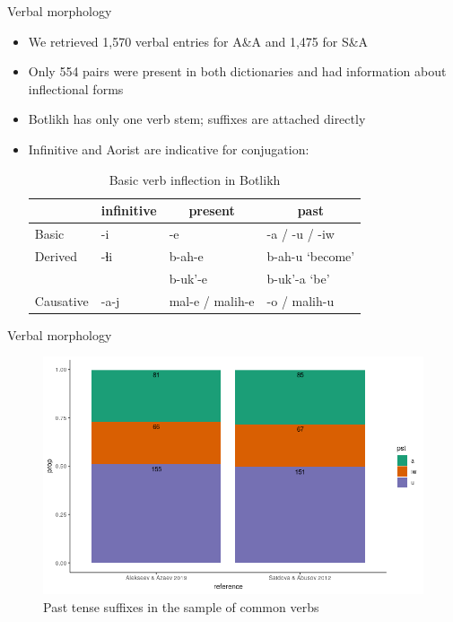 \begin{frame}{Verbal morphology}

\begin{itemize}
    \item We retrieved 1,570 verbal entries for A\&A and 1,475 for S\&A 
    \item Only 554 pairs were present in both dictionaries and had information about inflectional forms
    \pause
    \item Botlikh has only one verb stem; suffixes are attached directly
    \item Infinitive and Aorist are indicative for conjugation:
    \pause

\begin{table}[h]
\caption{Basic verb inflection in Botlikh}
\label{tab:verbtense}
\begin{tabular}{l|l|l|l}
          & \multicolumn{1}{c|}{infinitive} & \multicolumn{1}{c|}{present} & \multicolumn{1}{c}{past} \\ \hline
Basic     & -i                              & -e                           & -a / -u / -iw            \\
Derived   & -ɬi                             & b-ah-e                       & b-ah-u `become'          \\
          &                                 & b-uk'-e                      & b-uk'-a `be'             \\
Causative & -a-j                            & mal-e / malih-e              & -o / malih-u            
\end{tabular}
\end{table}
\end{itemize}

\end{frame}

\begin{frame}{Verbal morphology}

\begin{figure}[h]
\centering
\caption{Past tense suffixes in the sample of common verbs}
\includegraphics[scale=0.5]{images/pst.png}
\end{figure}
\end{frame}

